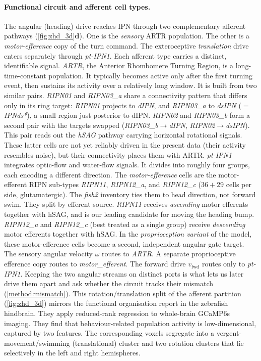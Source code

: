 \documentclass[11pt]{article}
\begin{document}
\paragraph{Functional circuit and afferent cell types.}
\label{method:proprioception}
The angular (heading) drive reaches IPN through two complementary
afferent pathways (\cref{fig:zhd_3d}\textbf{d}). One is the \emph{sensory}
ARTR population. The other is a \emph{motor-efference} copy of the turn
command. The exteroceptive \emph{translation} drive enters separately
through \emph{pt-IPN1}. Each afferent type carries a distinct, identifiable
signal. \emph{ARTR}, the Anterior Rhombomere Turning Region, is a
long-time-constant population. It typically becomes active only after the
first turning event, then sustains its activity over a relatively long
window. It is built from two similar pairs. \emph{RIPN01} and
\emph{RIPN03\_a} share a connectivity pattern that differs only in its ring
target: \emph{RIPN01} projects to \emph{dIPN}, and \emph{RIPN03\_a} to
\emph{dsIPN} ($=$\emph{IPNds*}), a small region just posterior to dIPN.
\emph{RIPN02} and \emph{RIPN03\_b} form a second pair with the targets
swapped (\emph{RIPN03\_b}$\to$\emph{dIPN}, \emph{RIPN02}$\to$\emph{dsIPN}).
This pair reads out the \emph{hSAG} pathway carrying horizontal rotational
signals. These latter cells are not yet reliably driven in the present data
(their activity resembles noise), but their connectivity places them with
ARTR. \emph{pt-IPN1} integrates optic-flow and water-flow signals. It
divides into roughly four groups, each encoding a different direction. The
\emph{motor-efference} cells are the motor-efferent RIPN sub-types
\emph{RIPN11}, \emph{RIPN12\_a}, and \emph{RIPN12\_c} ($36+29$ cells per
side, glutamatergic). The \emph{fish2} inventory ties them to head
direction, not forward swim. They split by efferent source. \emph{RIPN11}
receives \emph{ascending} motor efferents together with hSAG, and is our
leading candidate for moving the heading bump. \emph{RIPN12\_a} and
\emph{RIPN12\_c} (best treated as a single group) receive \emph{descending}
motor efferents together with hSAG. In the \emph{proprioception variant} of the model, these motor-efference
cells become a second, independent angular gate target. The sensory angular
velocity $\omega$ routes to \emph{ARTR}. A separate proprioceptive efference
copy routes to \emph{motor\_efferent}. The forward drive $v_{\mathrm{fwd}}$
routes only to \emph{pt-IPN1}. Keeping the two angular streams on distinct
ports is what lets us later drive them apart and ask whether the circuit
tracks their mismatch (\cref{method:mismatch}). This rotation/translation
split of the afferent partition (\cref{fig:zhd_3d}) mirrors the functional
organisation \citet{feierstein2023} report in the zebrafish hindbrain. They
apply reduced-rank regression to whole-brain GCaMP6s imaging. They find
that behaviour-related population activity is low-dimensional, captured by
two features. The corresponding voxels segregate into a
vergent-movement/swimming (translational) cluster and two rotation clusters
that lie selectively in the left and right hemispheres.
\end{document}
